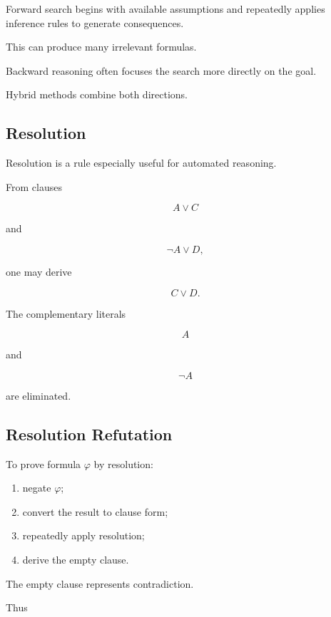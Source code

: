 Forward search begins with available assumptions and repeatedly applies
inference rules to generate consequences.

This can produce many irrelevant formulas.

Backward reasoning often focuses the search more directly on the goal.

Hybrid methods combine both directions.

\subsection{Resolution}
\label{subsec:proof-theory-resolution}

Resolution is a rule especially useful for automated reasoning.

From clauses

\[
\boxed{
A\lor C
}
\]

and

\[
\boxed{
\neg A\lor D,
}
\]

one may derive

\[
\boxed{
C\lor D.
}
\]

The complementary literals

\[
A
\]

and

\[
\neg A
\]

are eliminated.

\subsection{Resolution Refutation}
\label{subsec:resolution-refutation}

To prove formula \(\varphi\) by resolution:

\begin{enumerate}
    \item negate \(\varphi\);
    \item convert the result to clause form;
    \item repeatedly apply resolution;
    \item derive the empty clause.
\end{enumerate}

The empty clause represents contradiction.

Thus

